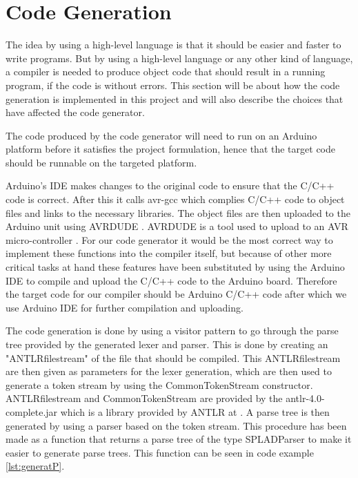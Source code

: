 \section{Code Generation}
\label{sec:codegeneration}
The idea by using a high-level language is that it should be easier and faster to write programs. But by using a high-level language or any other kind of language, a compiler is needed to produce object code that should result in a running program, if the code is without errors. This section will be about how the code generation is implemented in this project and will also describe the choices that have affected the code generator.

The code produced by the code generator will need to run on an Arduino platform before it satisfies the project formulation, hence that the target code should be runnable on the targeted platform.

Arduino's IDE makes changes to the original code to ensure that the C/C++ code is correct. After this it calls avr-gcc which complies C/C++ code to object files and links to the necessary libraries. The object files are then uploaded to the Arduino unit using AVRDUDE \citep{Buildproc}. AVRDUDE is a tool used to upload to an AVR micro-controller \citep{AVRDUDE}. For our code generator it would be the most correct way to implement these functions into the compiler itself, but because of other more critical tasks at hand these features have been substituted by using the Arduino IDE to compile and upload the C/C++ code to the Arduino board. Therefore the target code for our compiler should be Arduino C/C++ code after which we use Arduino IDE for further compilation and uploading.


The code generation is done by using a visitor pattern to go through the parse tree provided by the generated lexer and parser. This is done by creating an "ANTLRfilestream" of the file that should be compiled. This ANTLRfilestream are then given as parameters for the lexer generation, which are then used to generate a token stream by using the CommonTokenStream constructor. ANTLRfilestream and CommonTokenStream are provided by the antlr-4.0-complete.jar which is a library provided by ANTLR at \citep{DownloadANTLR}. A parse tree is then generated by using a parser based on the token stream. This procedure has been made as a function that returns a parse tree of the type SPLADParser to make it easier to generate parse trees. This function can be seen in code example \ref{lst:generatP}.

